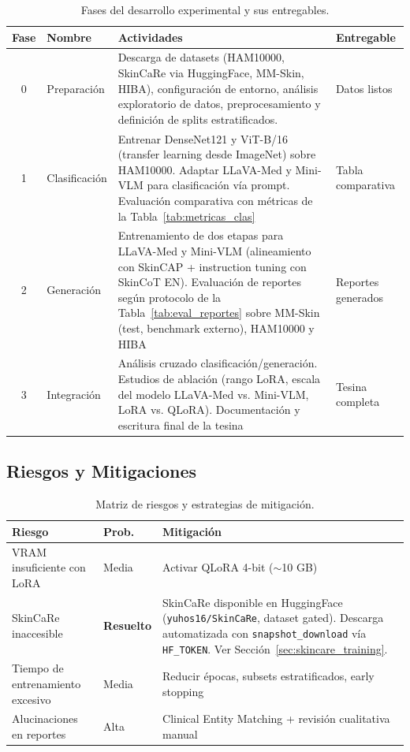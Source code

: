 \documentclass[11pt, a4paper]{article}
\begin{document}
\begin{table}[H]
\centering
\caption{Fases del desarrollo experimental y sus entregables.}
\label{tab:cronograma}
\small
\begin{tabular}{@{}clp{8.5cm}l@{}}
\toprule
\textbf{Fase} & \textbf{Nombre} & \textbf{Actividades} & \textbf{Entregable} \\
\midrule
\rowcolor{phase0!15}
0 & Preparación & Descarga de datasets (HAM10000, SkinCaRe via HuggingFace, MM-Skin, HIBA), configuración de entorno, análisis exploratorio de datos, preprocesamiento y definición de splits estratificados. & Datos listos \\
\rowcolor{phase1!15}
1 & Clasificación & Entrenar DenseNet121 y ViT-B/16 (transfer learning desde ImageNet) sobre HAM10000. Adaptar LLaVA-Med y Mini-VLM para clasificación vía prompt. Evaluación comparativa con métricas de la Tabla~\ref{tab:metricas_clas} & Tabla comparativa \\
\rowcolor{phase2!15}
2 & Generación & Entrenamiento de dos etapas para LLaVA-Med y Mini-VLM (alineamiento con SkinCAP + instruction tuning con SkinCoT EN). Evaluación de reportes según protocolo de la Tabla~\ref{tab:eval_reportes} sobre MM-Skin (test, benchmark externo), HAM10000 y HIBA & Reportes generados \\
\rowcolor{phase3!15}
3 & Integración & Análisis cruzado clasificación/generación. Estudios de ablación (rango LoRA, escala del modelo LLaVA-Med vs. Mini-VLM, LoRA vs. QLoRA). Documentación y escritura final de la tesina & Tesina completa \\
\bottomrule
\end{tabular}
\end{table}

\subsection{Riesgos y Mitigaciones}

\begin{table}[H]
\centering
\caption{Matriz de riesgos y estrategias de mitigación.}
\label{tab:riesgos}
\begin{tabular}{@{}p{4cm}lp{6cm}@{}}
\toprule
\textbf{Riesgo} & \textbf{Prob.} & \textbf{Mitigación} \\
\midrule
VRAM insuficiente con LoRA & Media & Activar QLoRA 4-bit ($\sim$10 GB) \\
SkinCaRe inaccesible & \textbf{Resuelto} & SkinCaRe disponible en HuggingFace (\texttt{yuhos16/SkinCaRe}, dataset gated). Descarga automatizada con \texttt{snapshot\_download} vía \texttt{HF\_TOKEN}. Ver Sección~\ref{sec:skincare_training}. \\
Tiempo de entrenamiento excesivo & Media & Reducir épocas, subsets estratificados, early stopping \\
Alucinaciones en reportes & Alta & Clinical Entity Matching + revisión cualitativa manual \\
\bottomrule
\end{tabular}
\end{table}
\end{document}
